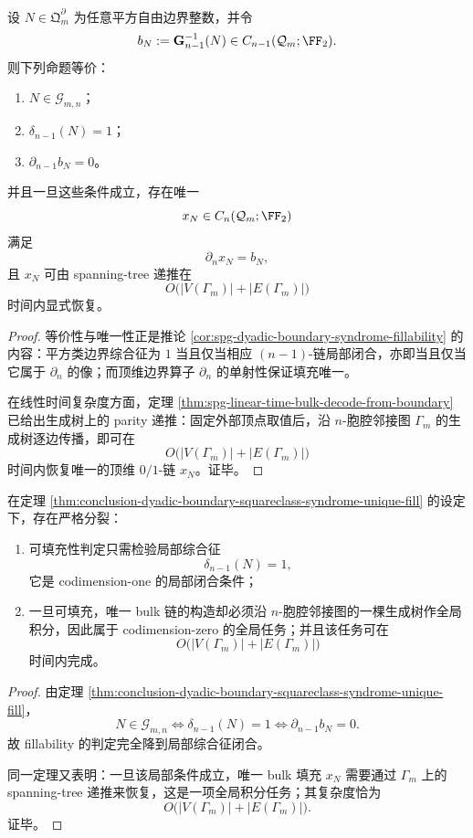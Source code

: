 \begin{theorem}\label{thm:conclusion-dyadic-boundary-squareclass-syndrome-unique-fill}
设 \(N\in \mathfrak Q_m^{\partial}\) 为任意平方自由边界整数，并令
\[
b_N:=\mathbf G_{n-1}^{-1}(N)\in C_{n-1}(\mathcal Q_m;\FF_2).
\]
则下列命题等价：
\begin{enumerate}
  \item \(N\in \mathcal G_{m,n}\)；
  \item \(\delta_{n-1}(N)=1\)；
  \item \(\partial_{n-1}b_N=0\)。
\end{enumerate}
并且一旦这些条件成立，存在唯一
\[
x_N\in C_n(\mathcal Q_m;\FF_2)
\]
满足
\[
\partial_n x_N=b_N,
\]
且 \(x_N\) 可由 spanning-tree 递推在
\[
O\bigl(|V(\Gamma_m)|+|E(\Gamma_m)|\bigr)
\]
时间内显式恢复。
\end{theorem}
\begin{proof}
等价性与唯一性正是推论 \ref{cor:spg-dyadic-boundary-syndrome-fillability} 的内容：平方类边界综合征为 \(1\) 当且仅当相应 \((n-1)\)-链局部闭合，亦即当且仅当它属于 \(\partial_n\) 的像；而顶维边界算子 \(\partial_n\) 的单射性保证填充唯一。

在线性时间复杂度方面，定理 \ref{thm:spg-linear-time-bulk-decode-from-boundary} 已给出生成树上的 parity 递推：固定外部顶点取值后，沿 \(n\)-胞腔邻接图 \(\Gamma_m\) 的生成树逐边传播，即可在
\[
O\bigl(|V(\Gamma_m)|+|E(\Gamma_m)|\bigr)
\]
时间内恢复唯一的顶维 \(0/1\)-链 \(x_N\)。证毕。
\end{proof}

\begin{corollary}\label{cor:conclusion-dyadic-boundary-fillability-construction-split}
在定理 \ref{thm:conclusion-dyadic-boundary-squareclass-syndrome-unique-fill} 的设定下，存在严格分裂：
\begin{enumerate}
  \item 可填充性判定只需检验局部综合征
  \[
  \delta_{n-1}(N)=1,
  \]
  它是 codimension-one 的局部闭合条件；
  \item 一旦可填充，唯一 bulk 链的构造却必须沿 \(n\)-胞腔邻接图的一棵生成树作全局积分，因此属于 codimension-zero 的全局任务；并且该任务可在
  \[
  O\bigl(|V(\Gamma_m)|+|E(\Gamma_m)|\bigr)
  \]
  时间内完成。
\end{enumerate}
\end{corollary}
\begin{proof}
由定理 \ref{thm:conclusion-dyadic-boundary-squareclass-syndrome-unique-fill}，
\[
N\in \mathcal G_{m,n}
\iff
\delta_{n-1}(N)=1
\iff
\partial_{n-1}b_N=0.
\]
故 fillability 的判定完全降到局部综合征闭合。

同一定理又表明：一旦该局部条件成立，唯一 bulk 填充 \(x_N\) 需要通过 \(\Gamma_m\) 上的 spanning-tree 递推来恢复，这是一项全局积分任务；其复杂度恰为
\[
O\bigl(|V(\Gamma_m)|+|E(\Gamma_m)|\bigr).
\]
证毕。
\end{proof}

